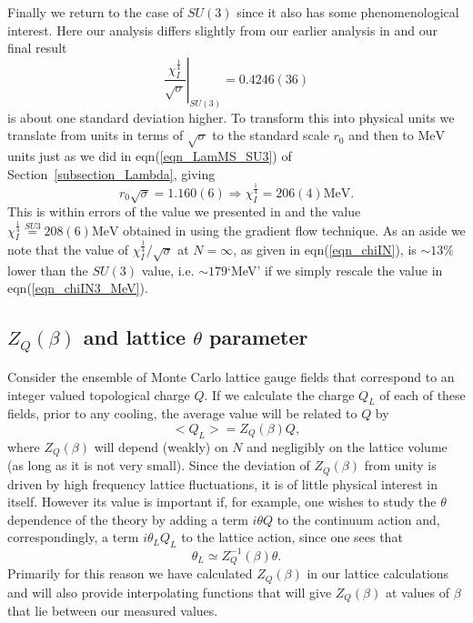 \documentclass[12pt]{article}
\newcommand{\be}{\begin{equation}}
\newcommand{\ee}{\end{equation}}
\begin{document}
Finally we return to the case of $SU(3)$ since it also has some phenomenological interest.
Here our analysis differs slightly from our earlier analysis in
%
\cite{AAMT-2020}
%
and our final result
%
\be
\left.\frac{\chi_I^{\frac{1}{4}}}{\surd\sigma}\right|_{SU(3)}
=
0.4246(36)
\label{eqn_chiIN3}
\ee
%
is about one standard deviation higher. To transform this into physical units
we translate from units in terms of $\surd\sigma$ to the standard scale $r_0$
and then to $\mathrm{MeV}$ units just as we did in eqn(\ref{eqn_LamMS_SU3}) of
Section~\ref{subsection_Lambda}, giving
%
\be
r_0\surd\sigma = 1.160(6) \Longrightarrow   \chi_I^{\frac{1}{4}} = 206(4)\mathrm{MeV}.
\label{eqn_chiIN3_MeV}
\ee
%
This is within errors of the value we presented in
%
\cite{AAMT-2020}
%
and the value $\chi_I^{\frac{1}{4}} \stackrel{SU3}{=} 208(6)\mathrm{MeV}$ obtained in
%
\cite{MLFP_SU3_10}
%
using the gradient flow technique. As an aside we note that the value of  
$\chi_I^{\frac{1}{4}}/\surd\sigma$ at $N=\infty$, as given in eqn(\ref{eqn_chiIN}),
is $\sim 13\%$ lower than the $SU(3)$ value, i.e. $\sim 179$`MeV' if
we simply rescale the value in eqn(\ref{eqn_chiIN3_MeV}).




%
%
\subsection{${Z_Q(\beta)}$ and lattice $\theta$ parameter}
\label{subsection_QZ} 

Consider the ensemble of Monte Carlo lattice gauge fields that correspond to an integer valued 
topological charge $Q$. If we calculate the charge $Q_L$ of each of these fields, prior to
any cooling, the average value will be related to $Q$ by
%
\cite{Pisa_ZQ}
%
\be
<Q_L> = Z_Q(\beta) Q,
\label{eqn_ZQ}
\ee
%
where  $Z_Q(\beta)$ will depend (weakly) on $N$ and negligibly on the lattice volume (as long
as it is not very small). Since the deviation of  $Z_Q(\beta)$ from unity is driven by high
frequency lattice fluctuations, it is of little physical interest in itself. However its
value is important if, for example, one wishes to study the $\theta$ dependence of the theory by
adding a term $i\theta Q$ to the continuum action and, correspondingly, a term $i\theta_L Q_L$
to the lattice action, since one sees that
%
\cite{Pisa_theta}
%
\be
\theta_L \simeq  Z^{-1}_Q(\beta) \theta.
\label{eqn_theta}
\ee
%
Primarily for this reason we have calculated  $Z_Q(\beta)$ in our lattice calculations
and will also provide interpolating functions that will give  $Z_Q(\beta)$ at values
of $\beta$ that lie between our measured values.
\end{document}
